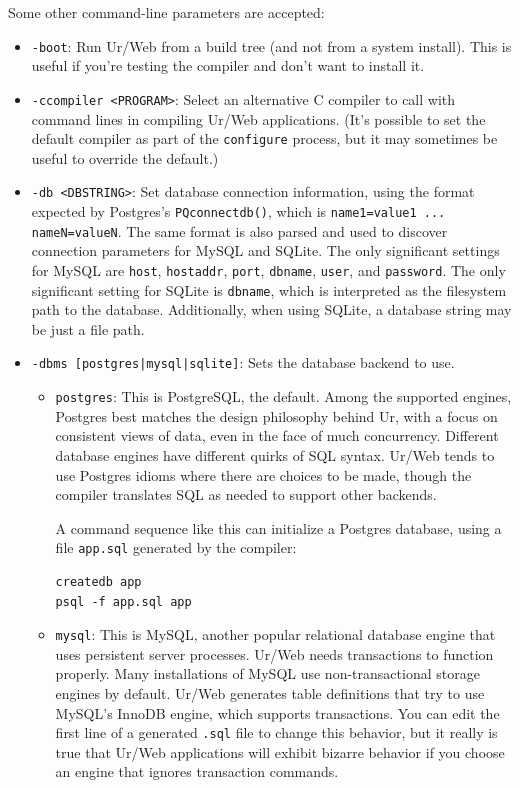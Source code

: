 \documentclass{article}
\begin{document}
Some other command-line parameters are accepted:
\begin{itemize}
\item \texttt{-boot}: Run Ur/Web from a build tree (and not from a system install).  This is useful if you're testing the compiler and don't want to install it.

\item \texttt{-ccompiler <PROGRAM>}: Select an alternative C compiler to call with command lines in compiling Ur/Web applications.  (It's possible to set the default compiler as part of the \texttt{configure} process, but it may sometimes be useful to override the default.)

\item \texttt{-db <DBSTRING>}: Set database connection information, using the format expected by Postgres's \texttt{PQconnectdb()}, which is \texttt{name1=value1 ... nameN=valueN}.  The same format is also parsed and used to discover connection parameters for MySQL and SQLite.  The only significant settings for MySQL are \texttt{host}, \texttt{hostaddr}, \texttt{port}, \texttt{dbname}, \texttt{user}, and \texttt{password}.  The only significant setting for SQLite is \texttt{dbname}, which is interpreted as the filesystem path to the database.  Additionally, when using SQLite, a database string may be just a file path.

\item \texttt{-dbms [postgres|mysql|sqlite]}: Sets the database backend to use.
  \begin{itemize}
  \item \texttt{postgres}: This is PostgreSQL, the default.  Among the supported engines, Postgres best matches the design philosophy behind Ur, with a focus on consistent views of data, even in the face of much concurrency.  Different database engines have different quirks of SQL syntax.  Ur/Web tends to use Postgres idioms where there are choices to be made, though the compiler translates SQL as needed to support other backends.

    A command sequence like this can initialize a Postgres database, using a file \texttt{app.sql} generated by the compiler:
    \begin{verbatim}
createdb app
psql -f app.sql app
    \end{verbatim}

  \item \texttt{mysql}: This is MySQL, another popular relational database engine that uses persistent server processes.  Ur/Web needs transactions to function properly.  Many installations of MySQL use non-transactional storage engines by default.  Ur/Web generates table definitions that try to use MySQL's InnoDB engine, which supports transactions.  You can edit the first line of a generated \texttt{.sql} file to change this behavior, but it really is true that Ur/Web applications will exhibit bizarre behavior if you choose an engine that ignores transaction commands.


\end{itemize}
\end{itemize}
\end{document}
